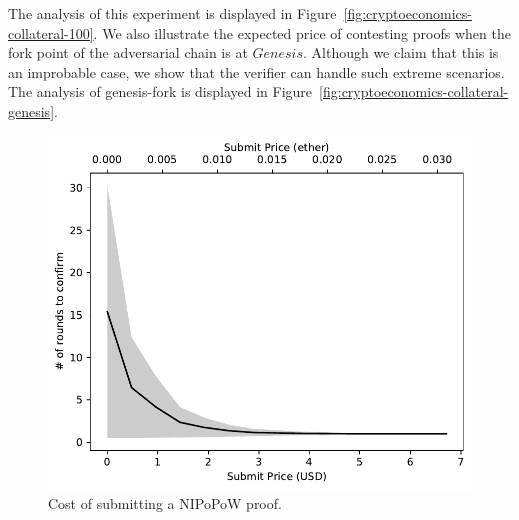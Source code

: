The analysis of this
experiment is displayed in Figure~\ref{fig:cryptoeconomics-collateral-100}. We
also illustrate the expected price of contesting proofs when the fork point of
the adversarial chain is at $Genesis$. Although we claim that this is an
improbable case, we show that the verifier can handle such extreme scenarios.
The analysis of genesis-fork is displayed in
Figure~\ref{fig:cryptoeconomics-collateral-genesis}.

\begin{figure}
    \centering
    \includegraphics[width=0.7\columnwidth]{figures/cryptoeconomics-submit.pdf}
    \caption{Cost of submitting a NIPoPoW proof.}
    \label{fig:cryptoeconomics-submit}
\end{figure}

